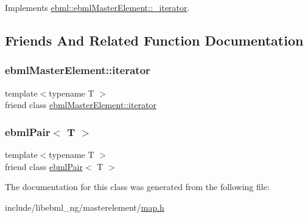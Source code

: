 Implements \mbox{\hyperlink{classebml_1_1ebmlMasterElement_1_1__iterator_ab0b53665f686e2ae379b275110ea3c95}{ebml\+::ebml\+Master\+Element\+::\+\_\+iterator}}.



\subsection{Friends And Related Function Documentation}
\mbox{\label{classebml_1_1ebmlPair_1_1__iterator_a7f678a46134f738b99dfff4aafa7fc5f}} 
\subsubsection{\texorpdfstring{ebml\+Master\+Element\+::iterator}{ebmlMasterElement::iterator}}
{\footnotesize\ttfamily template$<$typename T $>$ \\
friend class \mbox{\hyperlink{classebml_1_1ebmlMasterElement_1_1iterator}{ebml\+Master\+Element\+::iterator}}\hspace{0.3cm}{\ttfamily [friend]}}

\mbox{\label{classebml_1_1ebmlPair_1_1__iterator_ad1db4b5395f31070d1be2d251ee85e02}} 
\subsubsection{\texorpdfstring{ebml\+Pair$<$ T $>$}{ebmlPair< T >}}
{\footnotesize\ttfamily template$<$typename T $>$ \\
friend class \mbox{\hyperlink{classebml_1_1ebmlPair}{ebml\+Pair}}$<$ T $>$\hspace{0.3cm}{\ttfamily [friend]}}



The documentation for this class was generated from the following file\+:\begin{DoxyCompactItemize}
\item 
include/libebml\+\_\+ng/masterelement/\mbox{\hyperlink{map_8h}{map.\+h}}\end{DoxyCompactItemize}
